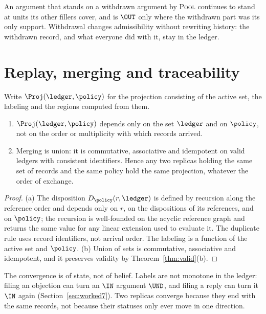 An argument that stands on a withdrawn argument by \textsc{Pool} continues to stand at units its other fillers cover, and is $\OUT$ only where the withdrawn part was its only support. Withdrawal changes admissibility without rewriting history: the withdrawn record, and what everyone did with it, stay in the ledger.

\section{Replay, merging and traceability}

Write $\Proj(\ledger,\policy)$ for the projection consisting of the active set, the labeling and the regions computed from them.

\begin{theorem}\label{thm:replay}
\begin{enumerate}[label=(\alph*)]
\item $\Proj(\ledger,\policy)$ depends only on the set $\ledger$ and on $\policy$, not on the order or multiplicity with which records arrived.
\item Merging is union: it is commutative, associative and idempotent on valid ledgers with consistent identifiers. Hence any two replicas holding the same set of records and the same policy hold the same projection, whatever the order of exchange.
\end{enumerate}
\end{theorem}

\begin{proof}
(a) The disposition $D_\policy(r,\ledger)$ is defined by recursion along the reference order and depends only on $r$, on the dispositions of its references, and on $\policy$; the recursion is well-founded on the acyclic reference graph and returns the same value for any linear extension used to evaluate it. The duplicate rule uses record identifiers, not arrival order. The labeling is a function of the active set and $\policy$. (b) Union of sets is commutative, associative and idempotent, and it preserves validity by Theorem~\ref{thm:valid}(b).
\end{proof}

The convergence is of state, not of belief. Labels are not monotone in the ledger: filing an objection can turn an $\IN$ argument $\UND$, and filing a reply can turn it $\IN$ again (Section~\ref{sec:worked7}). Two replicas converge because they end with the same records, not because their statuses only ever move in one direction.

